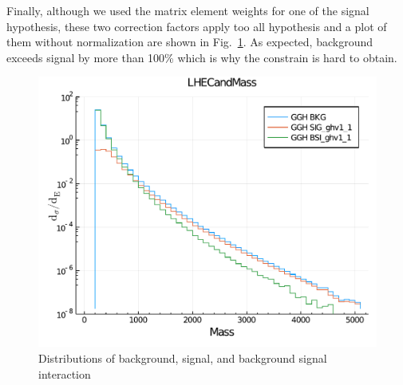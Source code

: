 Finally, although we used the matrix element weights for one of the signal hypothesis, these two
correction factors apply too all hypothesis and a plot of them without normalization are shown
in Fig.~\ref{fig:bsi_sig_bkg_compare}. As expected, background exceeds signal by more than 100\%
which is why the constrain is hard to obtain.
\begin{figure}[htb]
    \begin{center}
        \includegraphics[width=.7\linewidth]{fig/LHE_integral_difference.pdf}
    \end{center}
    \caption{Distributions of background, signal, and background signal interaction}
    \label{fig:bsi_sig_bkg_compare}
\end{figure}

